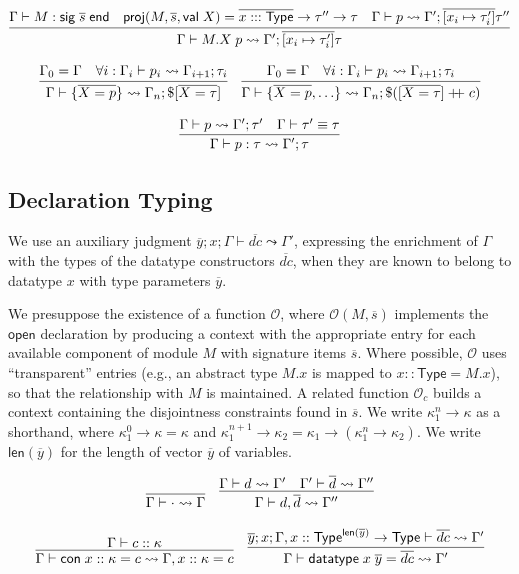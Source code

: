 \documentclass{article}
\newcommand{\mt}[1]{\mathsf{#1}}
\newcommand{\rc}{+ \hspace{-.075in} + \;}
\begin{document}
$$\infer{\Gamma \vdash M.X \; p \leadsto \Gamma'; \overline{[x_i \mapsto \tau'_i]}\tau}{
  \Gamma \vdash M : \mt{sig} \; \overline{s} \; \mt{end}
  & \mt{proj}(M, \overline{s}, \mt{val} \; X) = \overline{x ::: \mt{Type}} \to \tau'' \to \tau
  & \Gamma \vdash p \leadsto \Gamma'; \overline{[x_i \mapsto \tau'_i]}\tau''
}$$

$$\infer{\Gamma \vdash \{\overline{X = p}\} \leadsto \Gamma_n; \$[\overline{X = \tau}]}{
  \Gamma_0 = \Gamma
  & \forall i: \Gamma_i \vdash p_i \leadsto \Gamma_{i+1}; \tau_i
}
\quad \infer{\Gamma \vdash \{\overline{X = p}, \ldots\} \leadsto \Gamma_n; \$([\overline{X = \tau}] \rc c)}{
  \Gamma_0 = \Gamma
  & \forall i: \Gamma_i \vdash p_i \leadsto \Gamma_{i+1}; \tau_i
}$$

$$\infer{\Gamma \vdash p : \tau \leadsto \Gamma'; \tau}{
  \Gamma \vdash p \leadsto \Gamma'; \tau'
  & \Gamma \vdash \tau' \equiv \tau
}$$

\subsection{Declaration Typing}

We use an auxiliary judgment $\overline{y}; x; \Gamma \vdash \overline{dc} \leadsto \Gamma'$, expressing the enrichment of $\Gamma$ with the types of the datatype constructors $\overline{dc}$, when they are known to belong to datatype $x$ with type parameters $\overline{y}$.

We presuppose the existence of a function $\mathcal O$, where $\mathcal O(M, \overline{s})$ implements the $\mt{open}$ declaration by producing a context with the appropriate entry for each available component of module $M$ with signature items $\overline{s}$.  Where possible, $\mathcal O$ uses ``transparent'' entries (e.g., an abstract type $M.x$ is mapped to $x :: \mt{Type} = M.x$), so that the relationship with $M$ is maintained.  A related function $\mathcal O_c$ builds a context containing the disjointness constraints found in $\overline s$.
We write $\kappa_1^n \to \kappa$ as a shorthand, where $\kappa_1^0 \to \kappa = \kappa$ and $\kappa_1^{n+1} \to \kappa_2 = \kappa_1 \to (\kappa_1^n \to \kappa_2)$.  We write $\mt{len}(\overline{y})$ for the length of vector $\overline{y}$ of variables.

$$\infer{\Gamma \vdash \cdot \leadsto \Gamma}{}
\quad \infer{\Gamma \vdash d, \overline{d} \leadsto \Gamma''}{
  \Gamma \vdash d \leadsto \Gamma'
  & \Gamma' \vdash \overline{d} \leadsto \Gamma''
}$$

$$\infer{\Gamma \vdash \mt{con} \; x :: \kappa = c \leadsto \Gamma, x :: \kappa = c}{
  \Gamma \vdash c :: \kappa
}
\quad \infer{\Gamma \vdash \mt{datatype} \; x \; \overline{y} = \overline{dc} \leadsto \Gamma'}{
  \overline{y}; x; \Gamma, x :: \mt{Type}^{\mt{len}(\overline y)} \to \mt{Type} \vdash \overline{dc} \leadsto \Gamma'
}$$
\end{document}
